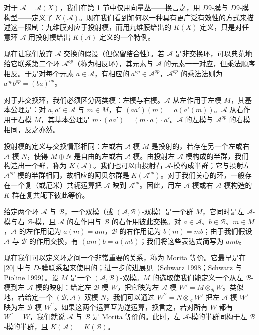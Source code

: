 对于 \({\mathcal A}={\mathcal A}(X)\)，我们在第 1 节中仅用向量丛——换言之，用 \(D9\)-膜与 \(\overline {D9}\)-膜构型——定义了 \(K({\mathcal A})\)。现在我们看到如何以一种具有更广泛有效性的方式来描述这一限制：九维膜对应于投射模，而用九维膜给出的 \(K(X)\) 定义，只是对任意环 \({\mathcal A}\) 用投射模给出 \(K({\mathcal A})\) 定义的一个特例。

现在让我们放弃 \({\mathcal A}\) 交换的假设（但保留结合性）。若 \({\mathcal A}\) 是非交换环，可以典范地给它联系第二个环 \({\mathcal A}^{op}\)（称为相反环），其元素与 \({\mathcal A}\) 的元素一一对应，但乘法顺序相反。于是对每个元素 \(a\in {\mathcal A}\)，有相应的 \(a^{op}\in {\mathcal A}^{op}\)，\({\mathcal A}^{op}\) 的乘法法则为 \(a^{op}b^{op}=(ba)^{op}\)。

对于非交换环，我们必须区分两类模：左模与右模。\({\mathcal A}\) 从左作用于左模 \(M\)，其基本公理是：对 \(a,a'\in {\mathcal A}\) 与 \(m\in M\)，有 \((aa')(m)=a(a'(m))\)。\({\mathcal A}\) 从右作用于右模 \(M\)，其基本公理是 \(m\cdot (aa')=(m\cdot a)\cdot a'\)。\({\mathcal A}\) 的左模与 \({\mathcal A}^{op}\) 的右模相同，反之亦然。

投射模的定义与交换情形相同：左或右 \({\mathcal A}\)-模 \(M\) 是投射的，若存在另一个左或右 \({\mathcal A}\)-模 \(N\)，使得 \(M\oplus N\) 是自由的左或右 \({\mathcal A}\)-模。由投射左 \({\mathcal A}\)-模构成的半群，我们构造出一个群，称为 \(K({\mathcal A})\)。我们也可以由投射右 \({\mathcal A}\)-模构成半群；它与投射左 \({\mathcal A}^{op}\)-模的半群相同，故相应的阿贝尔群是 \(K({\mathcal A}^{op})\)。对于我们关心的环，一般存在一个复（或厄米）共轭运算把 \({\mathcal A}\) 映到 \({\mathcal A}^{op}\)。因此，用左 \({\mathcal A}\)-模或右 \({\mathcal A}\)-模构造的 \(K\)-群在复共轭下彼此等价。

给定两个环 \({\mathcal A}\) 与 \({\mathcal B}\)，一个双模（或 \(({\mathcal A},{\mathcal B})\)-双模）是一个群 \(M\)，它同时是左 \({\mathcal A}\)-模与右 \({\mathcal B}\)-模，且 \({\mathcal A}\) 的左作用与 \({\mathcal B}\) 的右作用彼此交换。对 \(a\in {\mathcal A}\)、\(b\in {\mathcal B}\)、\(m\in M\)，\({\mathcal A}\) 的左作用记为 \(a(m)=am\)，\({\mathcal B}\) 的右作用记为 \(b(m)=mb\)；由于我们假设 \({\mathcal A}\) 与 \({\mathcal B}\) 的作用交换，有 \((am)b=a(mb)\)；我们将这些表达式简写为 \(amb\)。

现在我们可以定义环之间一个非常重要的关系，称为 Morita 等价。它最早是在 [20] 中与 \(D\)-膜联系起来使用的；进一步的进展见（Schwarz 1998；Schwarz 与 Pioline 1999）。设 \(M\) 是一个 \(({\mathcal A},{\mathcal B})\)-双模。\(M\) 的选取使我们能定义一个从左 \({\mathcal B}\)-模到左 \({\mathcal A}\)-模的映射：给定左 \({\mathcal B}\)-模 \(W\)，把它映为左 \({\mathcal A}\)-模 \(W'=M\otimes_{{\mathcal B}}W\)。类似地，若给定一个 \(({\mathcal B},{\mathcal A})\)-双模 \(N\)，我们可以通过 \(W^{\prime\prime}=N\otimes_{\mathcal A}W'\) 把左 \({\mathcal A}\)-模 \(W'\) 映为左 \({\mathcal B}\)-模 \(W^{\prime\prime}\)。如果这两个运算互为逆运算，换言之，若对所有 \(W\) 都有 \(W^{\prime\prime}=W\)，我们就说 \({\mathcal A}\) 与 \({\mathcal B}\) 是 Morita 等价的。此时，左 \({\mathcal A}\)-模的半群同构于左 \({\mathcal B}\)-模的半群，且 \(K({\mathcal A})=K({\mathcal B})\)。


